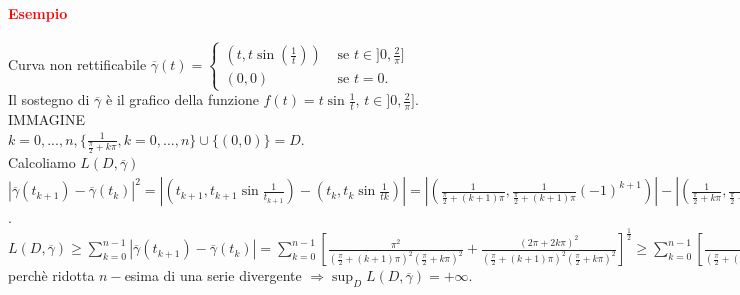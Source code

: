 \documentclass{article}
\begin{document}
\paragraph{\textcolor{red}{Esempio}}
Curva non rettificabile $\overline{\gamma}(t)= \begin{cases}
    (t,t \sin \left(\frac{1}{t}\right)) &\text{  se  } t \in ]0,\frac{2}{\pi}]\\
    (0,0)&\text{  se  } t=0.
\end{cases}$\\
Il sostegno di $\overline{\gamma}$ è il grafico della funzione $f(t)=t \sin \frac{1}{t}$, $t \in ]0,\frac{2}{\pi}]$.\\
IMMAGINE\\
$k=0,...,n,\{\frac{1}{\frac{\pi}{2}+k\pi}, k=0,...,n\}\cup \{(0,0)\}=D$.\\
Calcoliamo $L(D,\overline{\gamma})$\\
$|\overline{\gamma}(t_{k+1})-\overline{\gamma}(t_k)|^2=|\left(t_{k+1},t_{k+1}\sin \frac{1}{t_{k+1}}\right)-\left(t_k,t_k\sin\frac{1}{tk}\right)|=|\left(\frac{1}{\frac{\pi}{2}+(k+1)\pi},\frac{1}{\frac{\pi}{2}+(k+1)\pi} (-1)^{k+1}\right)|-|\left(\frac{1}{\frac{\pi}{2}+k\pi},\frac{1}{\frac{\pi}{2}+k\pi}(-1)^k\right)|^2=|\frac{1}{\frac{\pi}{2}+(k+1)\pi}-\frac{1}{\frac{\pi}{2}+k\pi}|+|\frac{1}{\frac{\pi}{2}+(k+1)\pi}+\frac{1}{\frac{\pi}{2}+k\pi}|^2=\frac{\pi^2}{\left(\frac{\pi}{2}+(k+1)\pi\right)^2\left(\frac{\pi}{2}+k\pi\right)^2}+\frac{(2\pi +2k\pi)^2}{\left(\frac{\pi}{2}+(k+1)\pi\right)^2\left(\frac{\pi}{2}+k\pi\right)^2}$.\\
$L(D,\overline{\gamma})\geq\sum_{k=0}^{n-1}|\overline{\gamma}(t_{k+1})-\overline{\gamma}(t_k)|=\sum_{k=0}^{n-1}\left[ \frac{\pi^2}{\left( \frac{\pi}{2}+(k+1)\pi \right)^2\left( \frac{\pi}{2}+k\pi\right)^2} + \frac{(2\pi +2k\pi)^2}{\left( \frac{\pi}{2}+(k+1)\pi \right)^2\left( \frac{\pi}{2}+k\pi \right)^2} \right]^{\frac{1}{2}} \geq \sum_{k=0}^{n-1}\left[ \frac{(2\pi+2k\pi)^2}{\left( \frac{\pi}{2}+(k+1)\pi \right)^2\left( \frac{\pi}{2}+k\pi \right)^2} \right]^{\frac{1}{2}}=\sum_{k=0}^{n-1}\frac{2\pi+2k\pi}{\left( \frac{\pi}{2}(k+1)\pi \right)\left( \frac{\pi}{2}+k\pi \right)} \xrightarrow{n \rightarrow \infty} +\infty$ perchè ridotta $n-$esima di una serie divergente $\Rightarrow \sup_D L(D,\overline{\gamma})=+\infty$.
\end{document}
